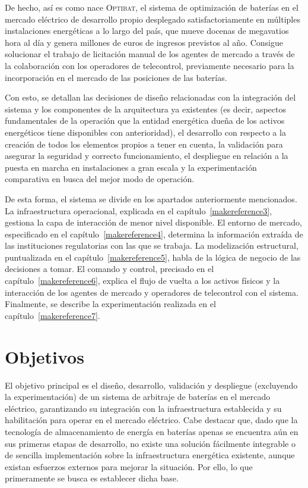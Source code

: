 De hecho, así es como nace \textsc{Optibat}, el sistema de optimización de baterías en el mercado eléctrico de desarrollo propio desplegado satisfactoriamente en múltiples instalaciones energéticas a lo largo del país, que mueve docenas de megavatios hora al día y genera millones de euros de ingresos previstos al año. Consigue solucionar el trabajo de licitación manual de los agentes de mercado a través de la colaboración con los operadores de telecontrol, previamente necesario para la incorporación en el mercado de las posiciones de las baterías.

Con esto, se detallan las decisiones de diseño relacionadas con la integración del sistema y los componentes de la arquitectura ya existentes (es decir, aspectos fundamentales de la operación que la entidad energética dueña de los activos energéticos tiene disponibles con anterioridad), el desarrollo con respecto a la creación de todos los elementos propios a tener en cuenta, la validación para asegurar la seguridad y correcto funcionamiento, el despliegue en relación a la puesta en marcha en instalaciones a gran escala y la experimentación comparativa en busca del mejor modo de operación.

De esta forma, el sistema se divide en los apartados anteriormente mencionados. La infraestructura operacional, explicada en el capítulo~\ref{makereference3}, gestiona la capa de interacción de menor nivel disponible. El entorno de mercado, especificado en el capítulo~\ref{makereference4}, determina la información extraída de las instituciones regulatorias con las que se trabaja. La modelización estructural, puntualizada en el capítulo~\ref{makereference5}, habla de la lógica de negocio de las decisiones a tomar. El comando y control, precisado en el capítulo~\ref{makereference6}, explica el flujo de vuelta a los activos físicos y la interacción de los agentes de mercado y operadores de telecontrol con el sistema. Finalmente, se describe la experimentación realizada en el capítulo~\ref{makereference7}.

\section{Objetivos}%
\label{makereference1.1}

El objetivo principal es el diseño, desarrollo, validación y despliegue (excluyendo la experimentación) de un sistema de arbitraje de baterías en el mercado eléctrico, garantizando su integración con la infraestructura establecida y su habilitación para operar en el mercado eléctrico. Cabe destacar que, dado que la tecnología de almacenamiento de energía en baterías apenas se encuentra aún en sus primeras etapas de desarrollo, no existe una solución fácilmente integrable o de sencilla implementación sobre la infraestructura energética existente, aunque existan esfuerzos externos para mejorar la situación. Por ello, lo que primeramente se busca es establecer dicha base.


